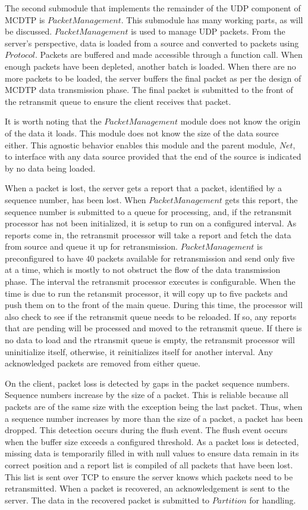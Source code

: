 The second submodule that implements the remainder of the UDP component of MCDTP is $PacketManagement$. This submodule has many working parts, as will be discussed. $PacketManagement$ is used to manage UDP packets. From the server's perspective, data is loaded from a source and converted to packets using $Protocol$. Packets are buffered and made accessible through a function call. When enough packets have been depleted, another batch is loaded. When there are no more packets to be loaded, the server buffers the final packet as per the design of MCDTP data transmission phase. The final packet is submitted to the front of the retransmit queue to ensure the client receives that packet.

It is worth noting that the $PacketManagement$ module does not know the origin of the data it loads. This module does not know the size of the data source either. This agnostic behavior enables this module and the parent module, $Net$, to interface with any data source provided that the end of the source is indicated by no data being loaded.

When a packet is lost, the server gets a report that a packet, identified by a sequence number, has been lost. When $PacketManagement$ gets this report, the sequence number is submitted to a queue for processing, and, if the retransmit processor has not been initialized, it is setup to run on a configured interval. As reports come in, the retransmit processor will take a report and fetch the data from source and queue it up for retransmission. $PacketManagement$ is preconfigured to have 40 packets available for retransmission and send only five at a time, which is mostly to not obstruct the flow of the data transmission phase. The interval the retransmit processor executes is configurable. When the time is due to run the retansmit processor, it will copy up to five packets and push them on to the front of the main queue. During this time, the processor will also check to see if the retransmit queue needs to be reloaded. If so, any reports that are pending will be processed and moved to the retransmit queue. If there is no data to load and the rtransmit queue is empty, the retransmit processor will uninitialize itself, otherwise, it reinitializes itself for another interval. Any acknowledged packets are removed from either queue.

On the client, packet loss is detected by gaps in the packet sequence numbers. Sequence numbers increase by the size of a packet. This is reliable because all packets are of the same size with the exception being the last packet. Thus, when a sequence number increases by more than the size of a packet, a packet has been dropped. This detection occurs during the flush event. The flush event occurs when the buffer size exceeds a configured threshold. As a packet loss is detected, missing data is temporarily filled in with null values to ensure data remain in its correct position and a report list is compiled of all packets that have been lost. This list is sent over TCP to ensure the server knows which packets need to be retransmitted. When a packet is recovered, an acknowledgement is sent to the server. The data in the recovered packet is submitted to $Partition$ for handling.

